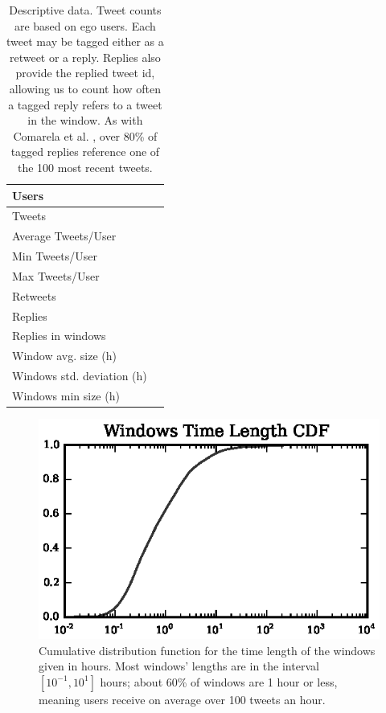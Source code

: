 \begin{table}[!tb]
	\centering
	\fontsize{9pt}{10pt}\selectfont
		\caption{Descriptive data. Tweet counts are based on ego users. Each tweet may be tagged either as a retweet or a reply. Replies also provide the replied tweet id, allowing us to count how often a tagged reply refers to a tweet in the window.  As with Comarela et al.  \cite{Comarela2012}, over 80\% of tagged replies reference one of the 100 most recent tweets. }
		\begin{tabular}{|l|c|}
			\hline
			Users & \totalUsers{} \\ \hline
			Tweets & \totalTweets{} \\ \hline
			Average Tweets/User & \averageTweetsUser{} \\ \hline
			Min Tweets/User & \minTweetsUser{} \\ \hline
			Max Tweets/User & \maxTweetsUser{} \\ \hline
			Retweets & \totalRetweets{} \\ \hline
			Replies & \totalReplies{} \\ \hline
			Replies in windows & \repliesInWindows{} \\ \hline
			Window avg. size (h) & \windowAverageSize{} \\ \hline
			Windows std. deviation (h) & \windowStdSize{} \\ \hline
			Windows min size (h) & \windowMinSize{} \\ \hline
		\end{tabular}
	\label{tab:databaseInformation}
\end{table}

\begin{figure}[!htbp]
\centering
\includegraphics[scale=1]{./figures/window_time_size_histogram.eps}
\caption{Cumulative distribution function for the time length of the windows given in hours. Most windows' lengths are in the interval $[10^{-1}, 10^1]$ hours; about 60\% of windows are 1 hour or less, meaning users receive on average over 100 tweets an hour.}
\label{fig:window_time_size_histogram}
\end{figure}

